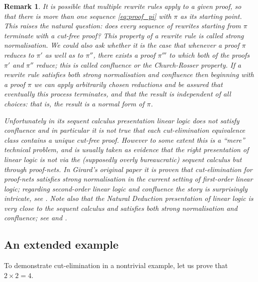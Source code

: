 \documentclass[english,letter paper,12pt,reqno]{article}
\theoremstyle{example}
\newtheorem{remark}[theorem]{Remark}
\numberwithin{equation}{section}
\begin{document}
\begin{remark} It is possible that multiple rewrite rules apply to a given proof, so that there is more than one sequence \eqref{eq:proof_pi} with $\pi$ as its starting point. This raises the natural question: does \emph{every} sequence of rewrites starting from $\pi$ terminate with a cut-free proof? This property of a rewrite rule is called \emph{strong normalisation}. We could also ask whether it is the case that whenever a proof $\pi$ reduces to $\pi'$ as well as to $\pi''$, there exists a proof $\pi'''$ to which both of the proofs $\pi'$ and $\pi''$ reduce; this is called \emph{confluence} or the \emph{Church-Rosser property}. If a rewrite rule satisfies both strong normalisation and confluence then beginning with a proof $\pi$ we can apply arbitrarily chosen reductions and be assured that eventually this process terminates, and that the result is independent of all choices: that is, the result is a \emph{normal form} of $\pi$.

Unfortunately in its sequent calculus presentation linear logic does \emph{not} satisfy confluence \cite[\S 1.3.1]{girard_synandsem} and in particular it is not true that each cut-elimination equivalence class contains a unique cut-free proof. However to some extent this is a ``mere'' technical problem, and is usually taken as evidence that the right presentation of linear logic is not via the (supposedly overly bureaucratic) sequent calculus but through \emph{proof-nets}. In Girard's original paper \cite[III.3]{girard_llogic} it is proven that cut-elimination for proof-nets satisfies strong normalisation in the current setting of first-order linear logic; regarding second-order linear logic and confluence the story is surprisingly intricate, see \cite{pagani}. Note also that the Natural Deduction presentation of linear logic is very close to the sequent calculus and satisfies both strong normalisation and confluence; see \cite{benton_strong} and \cite[\S 2.2]{brauner}.
\end{remark}

\subsection{An extended example}

To demonstrate cut-elimination in a nontrivial example, let us prove that $2 \times 2 = 4$.
\end{document}
